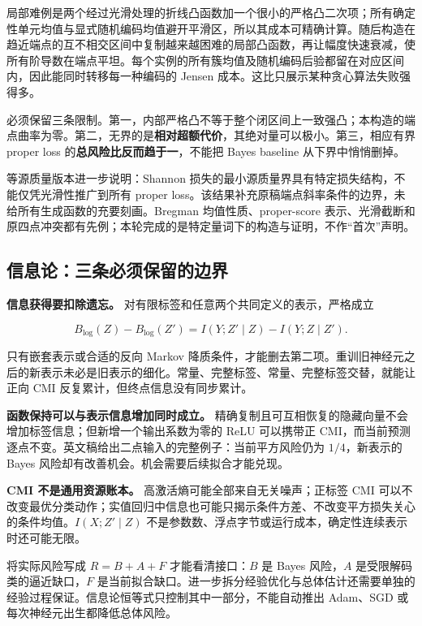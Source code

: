 \documentclass[11pt]{article}
\begin{document}
局部难例是两个经过光滑处理的折线凸函数加一个很小的严格凸二次项；所有确定性单元均值与显式随机编码均值避开平滑区，所以其成本可精确计算。随后构造在趋近端点的互不相交区间中复制越来越困难的局部凸函数，再让幅度快速衰减，使所有阶导数在端点平坦。每个实例的所有簇均值及随机编码后验都留在对应区间内，因此能同时转移每一种编码的 Jensen 成本。这比只展示某种贪心算法失败强得多。

必须保留三条限制。第一，内部严格凸不等于整个闭区间上一致强凸；本构造的端点曲率为零。第二，无界的是\textbf{相对超额代价}，其绝对量可以极小。第三，相应有界 proper loss 的\textbf{总风险比反而趋于一}，不能把 Bayes baseline 从下界中悄悄删掉。

等源质量版本进一步说明：Shannon 损失的最小源质量界具有特定损失结构，不能仅凭光滑性推广到所有 proper loss。该结果补充原稿端点斜率条件的边界，未给所有生成函数的充要刻画。Bregman 均值性质、proper-score 表示、光滑截断和原四点冲突都有先例；本轮完成的是特定量词下的构造与证明，不作``首次''声明。

\subsection{信息论：三条必须保留的边界}\label{ux4fe1ux606fux8bbaux4e09ux6761ux5fc5ux987bux4fddux7559ux7684ux8fb9ux754c}

\textbf{信息获得要扣除遗忘。} 对有限标签和任意两个共同定义的表示，严格成立

\[B_{\log}(Z)-B_{\log}(Z')=I(Y;Z'\mid Z)-I(Y;Z\mid Z').\]

只有嵌套表示或合适的反向 Markov 降质条件，才能删去第二项。重训旧神经元之后的新表示未必是旧表示的细化。常量、完整标签、常量、完整标签交替，就能让正向 CMI 反复累计，但终点信息没有同步累计。

\textbf{函数保持可以与表示信息增加同时成立。} 精确复制且可互相恢复的隐藏向量不会增加标签信息；但新增一个输出系数为零的 ReLU 可以携带正 CMI，而当前预测逐点不变。英文稿给出二点输入的完整例子：当前平方风险仍为 \(1/4\)，新表示的 Bayes 风险却有改善机会。机会需要后续拟合才能兑现。

\textbf{CMI 不是通用资源账本。} 高激活熵可能全部来自无关噪声；正标签 CMI 可以不改变最优分类动作；实值回归中信息也可能只揭示条件方差、不改变平方损失关心的条件均值。\(I(X;Z'\mid Z)\) 不是参数数、浮点字节或运行成本，确定性连续表示时还可能无限。

将实际风险写成 \(R=B+A+F\) 才能看清接口：\(B\) 是 Bayes 风险，\(A\) 是受限解码类的逼近缺口，\(F\) 是当前拟合缺口。进一步拆分经验优化与总体估计还需要单独的经验过程保证。信息论恒等式只控制其中一部分，不能自动推出 Adam、SGD 或每次神经元出生都降低总体风险。
\end{document}
